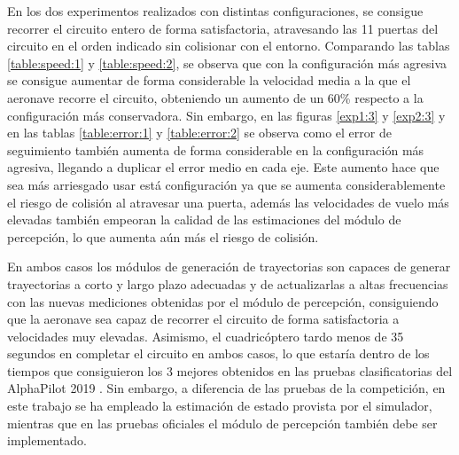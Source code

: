 En los dos experimentos realizados con distintas configuraciones, se consigue recorrer el circuito entero de forma satisfactoria, atravesando las 11 puertas del circuito en el orden indicado sin colisionar con el entorno. Comparando las tablas \ref{table:speed:1} y \ref{table:speed:2}, se observa que con la configuración más agresiva se consigue aumentar de forma considerable la velocidad media a la que el aeronave recorre el circuito, obteniendo un aumento de un 60\% respecto a la configuración más conservadora. Sin embargo, en las figuras \ref{exp1:3} y \ref{exp2:3}  y en las tablas \ref{table:error:1} y \ref{table:error:2} se observa como el error de seguimiento también aumenta de forma considerable en la configuración más agresiva, llegando a duplicar el error medio en cada eje. Este aumento hace que sea más arriesgado usar está configuración ya que se aumenta considerablemente el riesgo de colisión al atravesar una puerta, además las velocidades de vuelo más elevadas también empeoran la calidad de las estimaciones del módulo de percepción, lo que aumenta aún más el riesgo de colisión. 

En ambos casos los módulos de generación de trayectorias son capaces de generar trayectorias a corto y largo plazo adecuadas y de actualizarlas a altas frecuencias con las nuevas mediciones obtenidas por el módulo de percepción, consiguiendo que la aeronave sea capaz de recorrer el circuito de forma satisfactoria a velocidades muy elevadas.
Asimismo, el cuadricóptero tardo menos de 35 segundos en completar el circuito en ambos casos, lo que estaría dentro de los tiempos que consiguieron los 3 mejores obtenidos en las pruebas clasificatorias del AlphaPilot 2019 \cite{guerra2019flightgoggles}. Sin embargo, a diferencia de las pruebas de la competición, en este trabajo se ha empleado la estimación de estado provista por el simulador, mientras que en las pruebas oficiales el módulo de percepción también debe ser implementado. 






